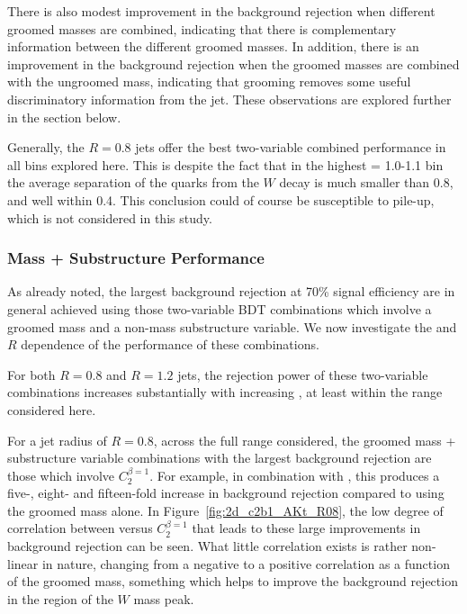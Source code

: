 
There is also modest improvement in
the background rejection when different groomed masses are combined,
 indicating that there is complementary information between the
different groomed masses. In addition, there is an improvement in the
background rejection when the groomed masses are combined with the
ungroomed mass, indicating that grooming removes some useful
discriminatory information from the jet. These observations are
explored further in the section below.

Generally, the $R=0.8$ jets offer the best two-variable
combined performance in all \pt bins explored here. This is despite
the fact that in the highest \pt = 1.0-1.1 \TeV bin the average
separation of the quarks from the $W$ decay is much smaller than 0.8,
and well within 0.4. This conclusion could of course be susceptible to
pile-up, which is not considered in this study.

\subsubsection{Mass + Substructure Performance}

As already noted, the largest background rejection at 70\% signal
efficiency are in general achieved using those two-variable BDT combinations
which involve a groomed mass and a non-mass substructure variable. We now investigate
the \pt and $R$ dependence of the performance of these combinations.

For both $R=0.8$ and $R=1.2$ jets, the rejection power of these two-variable
combinations increases substantially with increasing \pt, at least
within the \pt range considered here.

For a jet radius of $R=0.8$, across the full \pt range considered, the
groomed mass + substructure variable combinations with the
largest background rejection are those which
involve $C_2^{\beta=1}$. For example, in combination with
\msd, this produces a five-, eight- and fifteen-fold
increase in background rejection compared to using the groomed mass
alone. In Figure~\ref{fig:2d_c2b1_AKt_R08}, the low degree of
correlation between \msd versus $C_2^{\beta=1}$ that
leads to these large improvements in background rejection can be
seen. What little correlation exists is rather
non-linear in nature, changing from a negative to a positive
correlation as a function of the groomed mass, something which helps
to improve the background rejection in the region of the $W$ mass peak.

